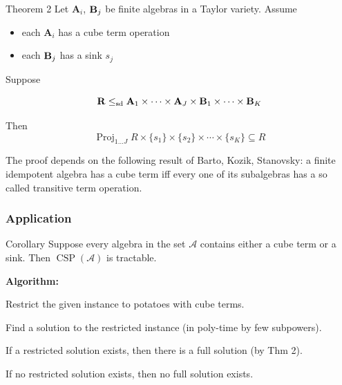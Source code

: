 \documentclass[10pt,xcolor=dvipsnames%
   ]{beamer}
\newcommand{\Proj}{\ensuremath{\operatorname{Proj}}}
\DeclareMathOperator{\CSP}{CSP}
\renewcommand{\.}{\cdot}
\newcommand{\sA}{\ensuremath{\mathcal{A}}}
\newcommand{\bA}{\ensuremath{\mathbf{A}}}
\newcommand{\bR}{\ensuremath{\mathbf{R}}}
\begin{document}
\begin{frame}

  \newcommand{\kk}{\ensuremath{\underline{k}}}
\newcommand{\sdp}{\ensuremath{\leq_{\mathrm{sd}}}}
    
\begin{exampleblock}{Theorem 2}
Let $\bA_i$, $\mathbf{B}_j$ be finite algebras in a Taylor variety. Assume

\begin{itemize}
\item 
each $\bA_i$ has a \alert{cube term} operation

\item
each $\mathbf{B}_j$ has a \alert{sink} $s_j$
\end{itemize}

Suppose

  \[
  \bR \sdp \bA_1 \times \cdots \times \bA_J \times \bB_1 \times \cdots \times \bB_K
  \]

  Then
  \[
  \Proj_{1 \dots J}R \times \{s_1\} \times \{s_2\} \times \cdots \times \{s_K\}  \subseteq R
  \]
\end{exampleblock}

\pause

The proof depends on the following result of Barto, Kozik, Stanovsky: a finite idempotent
algebra has a cube term iff every one of its subalgebras has a so called \alert{transitive term
operation}. 
\end{frame}

\begin{frame}
  \frametitle{Application}

  \begin{exampleblock}{Corollary}
  Suppose every algebra in the set $\sA$ contains either a cube term
  or a sink. Then $\CSP(\sA)$ is tractable.
  \end{exampleblock}
      {\bf Algorithm:}

      Restrict the given instance to potatoes with cube terms.

      Find a solution to the restricted instance (in poly-time by few subpowers).

      If a restricted solution exists, then there is a full solution (by Thm 2).

      If no restricted solution exists, then no full solution exists.
\end{frame}
\end{document}
